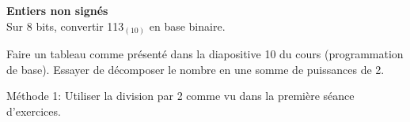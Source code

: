 \begin{Exercice}[5 minutes] \textbf{Entiers non signés}\\
	Sur 8 bits, convertir 113$_{(10)}$ en base binaire.
   
    \begin{conseil}
		Faire un tableau comme présenté dans la diapositive 10 du cours (programmation de base). Essayer de décomposer le nombre en une somme de puissances de 2.
    \end{conseil}
    
    \begin{solution}
        Méthode 1: Utiliser la division par 2 comme vu dans la première séance d'exercices.\\

        \begin{center}
        \begin{minipage}{0.3\textwidth}
    \centering


\end{minipage}
\end{center}
\end{solution}
\end{Exercice}

